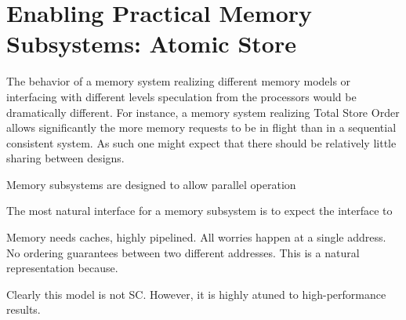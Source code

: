 \section{Enabling Practical Memory Subsystems: Atomic Store}

The behavior of a memory system realizing different memory models or
interfacing with different levels speculation from the processors would be
dramatically different. For instance, a memory system realizing Total Store
Order allows significantly the more memory requests to be in flight than in a
sequential consistent system. As such one might expect that there should be
relatively little sharing between designs.






Memory subsystems are designed to allow parallel operation 

The most natural interface for a memory subsystem is to expect the interface to 



Memory needs caches, highly pipelined. All worries happen at a single address. No ordering guarantees between two different addresses. This is a natural representation because. 

Clearly this model is not SC. However, it is highly atuned to high-performance results.
